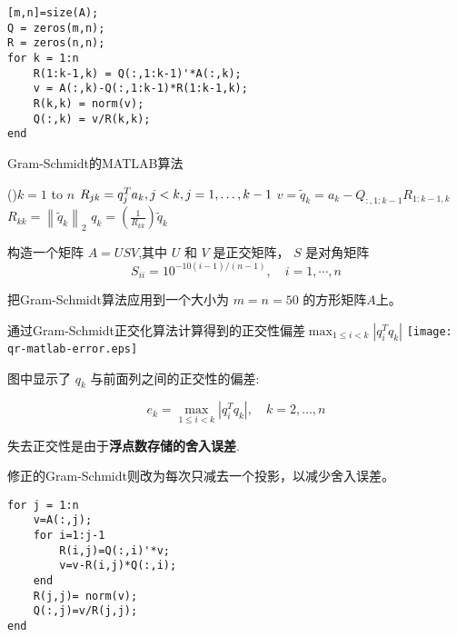 \begin{example}
    \begin{lstlisting}[caption=Gram Schmidt算法，language=matlab]
[m,n]=size(A);
Q = zeros(m,n);
R = zeros(n,n);
for k = 1:n
    R(1:k-1,k) = Q(:,1:k-1)'*A(:,k);
    v = A(:,k)-Q(:,1:k-1)*R(1:k-1,k);
    R(k,k) = norm(v);
    Q(:,k) = v/R(k,k);
end
    \end{lstlisting}

    \begin{algorithm}[htbp]
        \caption{Gram-Schmidt的MATLAB算法}
        \For(){$k = 1$ to $n$}{
            $R_{ {jk}} =q_j^T a_k ,j<k,j=1,\ldotp \ldotp \ldotp ,k-1$\;
            $v={\tilde{q} }_k =a_k -Q_{:,1:k-1} R_{1:k-1,k}$\;
            $R_{ {kk}} ={\left\|{\tilde{q} }_k \right\|}_2$\;
            $q_k =\left(\frac{1}{R_{kk} }\right){\tilde{q} }_k$\;
        }
    \end{algorithm}

    构造一个矩阵 $ A=U S V $,其中 $ U $ 和 $ V $ 是正交矩阵， $ S $ 是对角矩阵
    \begin{equation}
    S_{i i}=10^{-10(i-1) /(n-1)}, \quad i=1, \cdots, n
    \end{equation}

    把Gram-Schmidt算法应用到一个大小为 $  {m}= {n}=50 $ 的方形矩阵$A$上。

    \begin{FigureCenter}{通过Gram-Schmidt正交化算法计算得到的正交性偏差$\max _{1 \leq i<k}\left|q_{i}^{T} q_{k}\right|$}
        \texttt{[image: qr-matlab-error.eps]}
    \end{FigureCenter}


    图中显示了 $ q_{k} $ 与前面列之间的正交性的偏差:

    \begin{equation}
    e_{k}=\max _{1 \leq i<k}\left|q_{i}^{T} q_{k}\right|, \quad k=2, \ldots, n
    \end{equation}

    失去正交性是由于\textbf{浮点数存储的舍入误差}.

    修正的Gram-Schmidt则改为每次只减去一个投影，以减少舍入误差。

    \begin{lstlisting}[caption=modified Gram-Schmidt算法，language=matlab]
for j = 1:n
    v=A(:,j);
    for i=1:j-1
        R(i,j)=Q(:,i)'*v;
        v=v-R(i,j)*Q(:,i);
    end
    R(j,j)= norm(v);
    Q(:,j)=v/R(j,j);
end
    \end{lstlisting}


\end{example}
